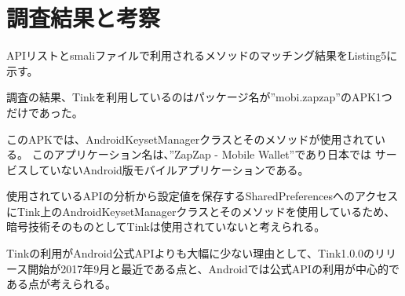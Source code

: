 \newpage
\section{調査結果と考察}

APIリストとsmaliファイルで利用されるメソッドのマッチング結果をListing5に示す。

調査の結果、Tinkを利用しているのはパッケージ名が”mobi.zapzap”のAPK1つだけであった。

このAPKでは、AndroidKeysetManagerクラスとそのメソッドが使用されている。
このアプリケーション名は、”ZapZap - Mobile Wallet”\cite{ZapZap}であり日本では
サービスしていないAndroid版モバイルアプリケーションである。

使用されているAPIの分析から設定値を保存するSharedPreferencesへのアクセスにTink上のAndroidKeysetManagerクラスとそのメソッドを使用しているため、
暗号技術そのものとしてTinkは使用されていないと考えられる。

Tinkの利用がAndroid公式APIよりも大幅に少ない理由として、Tink1.0.0のリリース開始が2017年9月と最近である点と、Androidでは公式APIの利用が中心的である点が考えられる。





